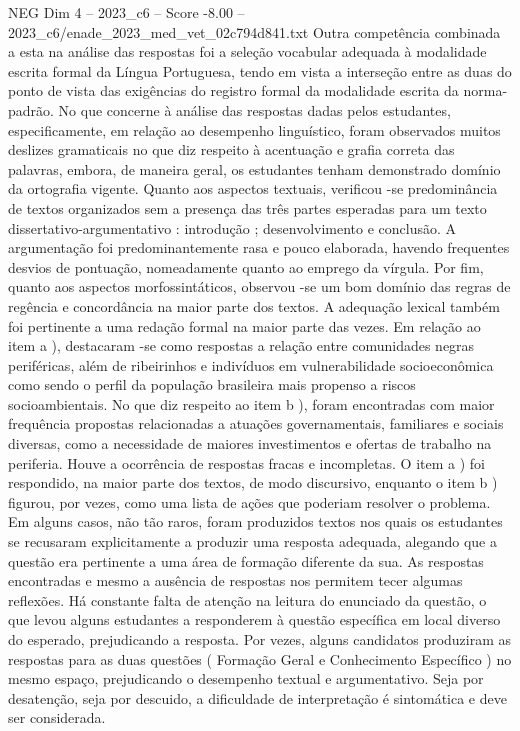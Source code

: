 \begin{textsample}{NEG Dim 4 – 2023\_c6 – Score -8.00 – 2023\_c6/enade\_2023\_med\_vet\_02c794d841.txt}
Outra competência combinada a esta na análise das respostas foi a seleção vocabular adequada à modalidade escrita formal da Língua Portuguesa, tendo em vista a interseção entre as duas do ponto de vista das exigências do registro formal da modalidade escrita da norma-padrão.
No que concerne à análise das respostas dadas pelos estudantes, especificamente, em relação ao desempenho linguístico, foram observados muitos deslizes gramaticais no que diz respeito à acentuação e grafia correta das palavras, embora, de maneira geral, os estudantes tenham demonstrado domínio da ortografia vigente.
Quanto aos aspectos textuais, verificou -se predominância de textos organizados sem a presença das três partes esperadas para um texto dissertativo-argumentativo : introdução ; desenvolvimento e conclusão.
A argumentação foi predominantemente rasa e pouco elaborada, havendo frequentes desvios de pontuação, nomeadamente quanto ao emprego da vírgula.
Por fim, quanto aos aspectos morfossintáticos, observou -se um bom domínio das regras de regência e concordância na maior parte dos textos.
A adequação lexical também foi pertinente a uma redação formal na maior parte das vezes.
Em relação ao item a ), destacaram -se como respostas a relação entre comunidades negras periféricas, além de ribeirinhos e indivíduos em vulnerabilidade socioeconômica como sendo o perfil da população brasileira mais propenso a riscos socioambientais.
No que diz respeito ao item b ), foram encontradas com maior frequência propostas relacionadas a atuações governamentais, familiares e sociais diversas, como a necessidade de maiores investimentos e ofertas de trabalho na periferia.
Houve a ocorrência de respostas fracas e incompletas.
O item a ) foi respondido, na maior parte dos textos, de modo discursivo, enquanto o item b ) figurou, por vezes, como uma lista de ações que poderiam resolver o problema.
Em alguns casos, não tão raros, foram produzidos textos nos quais os estudantes se recusaram explicitamente a produzir uma resposta adequada, alegando que a questão era pertinente a uma área de formação diferente da sua.
As respostas encontradas e mesmo a ausência de respostas nos permitem tecer algumas reflexões.
Há constante falta de atenção na leitura do enunciado da questão, o que levou alguns estudantes a responderem à questão específica em local diverso do esperado, prejudicando a resposta.
Por vezes, alguns candidatos produziram as respostas para as duas questões ( Formação Geral e Conhecimento Específico ) no mesmo espaço, prejudicando o desempenho textual e argumentativo.
Seja por desatenção, seja por descuido, a dificuldade de interpretação é sintomática e deve ser considerada.

\end{textsample}
